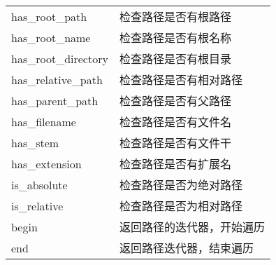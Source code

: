 \begin{longtable}{LL}
	has\_root\_path            & 检查路径是否有根路径                                \\
	has\_root\_name            & 检查路径是否有根名称                                \\
	has\_root\_directory       & 检查路径是否有根目录                                \\
	has\_relative\_path        & 检查路径是否有相对路径                              \\
	has\_parent\_path          & 检查路径是否有父路径                                \\
	has\_filename              & 检查路径是否有文件名                                \\
	has\_stem                  & 检查路径是否有文件干                                \\
	has\_extension             & 检查路径是否有扩展名                                \\
	is\_absolute               & 检查路径是否为绝对路径                              \\
	is\_relative               & 检查路径是否为相对路径                              \\
	begin                      & 返回路径的迭代器，开始遍历                          \\
	end                        & 返回路径迭代器，结束遍历                            \\
\end{longtable}

